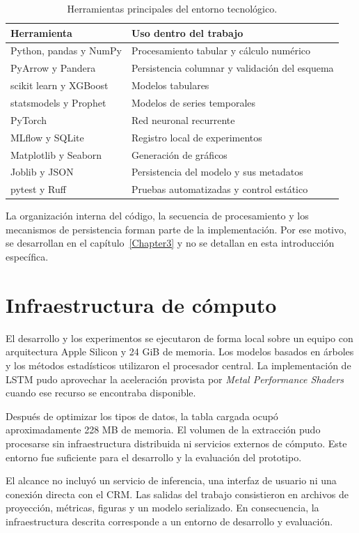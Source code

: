 \begin{table}[ht]
    \centering
    \caption{Herramientas principales del entorno tecnológico.}
    \label{tab:entornoTecnologico}
    \small
    \begin{tabular}{p{4cm} p{8.5cm}}
        \toprule
        Herramienta & Uso dentro del trabajo \\
        \midrule
        Python, pandas y NumPy & Procesamiento tabular y cálculo numérico \\
        PyArrow y Pandera & Persistencia columnar y validación del esquema \\
        scikit learn y XGBoost & Modelos tabulares \\
        statsmodels y Prophet & Modelos de series temporales \\
        PyTorch & Red neuronal recurrente \\
        MLflow y SQLite & Registro local de experimentos \\
        Matplotlib y Seaborn & Generación de gráficos \\
        Joblib y JSON & Persistencia del modelo y sus metadatos \\
        pytest y Ruff & Pruebas automatizadas y control estático \\
        \bottomrule
    \end{tabular}
\end{table}

La organización interna del código, la secuencia de procesamiento y los mecanismos de persistencia forman parte de la implementación. Por ese motivo, se desarrollan en el capítulo~\ref{Chapter3} y no se detallan en esta introducción específica.

\section{Infraestructura de cómputo}
\label{sec:infraestructuraComputo}

El desarrollo y los experimentos se ejecutaron de forma local sobre un equipo con arquitectura Apple Silicon y 24 GiB de memoria. Los modelos basados en árboles y los métodos estadísticos utilizaron el procesador central. La implementación de LSTM pudo aprovechar la aceleración provista por \textit{Metal Performance Shaders} cuando ese recurso se encontraba disponible.

Después de optimizar los tipos de datos, la tabla cargada ocupó aproximadamente 228 MB de memoria. El volumen de la extracción pudo procesarse sin infraestructura distribuida ni servicios externos de cómputo. Este entorno fue suficiente para el desarrollo y la evaluación del prototipo.

El alcance no incluyó un servicio de inferencia, una interfaz de usuario ni una conexión directa con el CRM. Las salidas del trabajo consistieron en archivos de proyección, métricas, figuras y un modelo serializado. En consecuencia, la infraestructura descrita corresponde a un entorno de desarrollo y evaluación. 